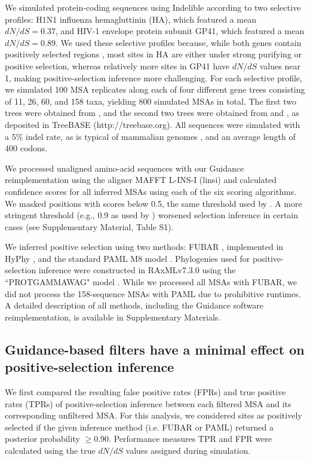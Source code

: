 \documentclass[11pt]{article}
\begin{document}
We simulated protein-coding sequences using Indelible \citep{Fletcher2009} according to two selective profiles: H1N1 influenza hemagluttinin (HA), which featured a mean $dN/dS = 0.37$, and HIV-1 envelope protein subunit GP41, which featured a mean $dN/dS = 0.89$. We used these selective profiles because, while both genes contain positively selected regions \citep{Bush1999, Frost2001, Bandawe2008, Meyer2012}, most sites in HA are either under strong purifying or positive selection, whereas relatively more sites in GP41 have $dN/dS$ values near 1, making positive-selection inference more challenging. For each selective profile, we simulated 100 MSA replicates along each of four different gene trees consisting of 11, 26, 60, and 158 taxa, yielding 800 simulated MSAs in total. The first two trees were obtained from \citet{Spielman2013}, and the second two trees were obtained from \citet{Yang2011} and \citet{Betancur2013}, as deposited in TreeBASE (http://treebase.org). All sequences were simulated with a 5\% indel rate, as is typical of mammalian genomes \citep{Cooper2004}, and an average length of 400 codons.

We processed unaligned amino-acid sequences with our Guidance reimplementation using the aligner MAFFT L-INS-I (linsi) \citep{Katoh2002,Katoh2005} and calculated confidence scores for all inferred MSAs using each of the six scoring algorithms. We masked positions with scores below 0.5, the same threshold used by \citet{Jordan2012}. A more stringent threshold (e.g., 0.9 as used by \citealt{Privman2012}) worsened selection inference in certain cases (see Supplementary Material, Table S1).

We inferred positive selection using two methods: FUBAR \citep{Murrell2013}, implemented in HyPhy \citep{Pond2005}, and the standard PAML M8 model \citep{Yang2000, Yang2007}. Phylogenies used for positive-selection inference were constructed in RAxMLv7.3.0 using the ``PROTGAMMAWAG" model \citep{Stamatakis2006}. While we processed all MSAs with FUBAR, we did not process the 158-sequence MSAs with PAML due to prohibitive runtimes. A detailed description of all methods, including the Guidance software reimplementation, is available in Supplementary Materials.


\subsection*{Guidance-based filters have a minimal effect on positive-selection inference}

We first compared the resulting false positive rates (FPRs) and true positive rates (TPRs) of positive-selection inference between each filtered MSA and its corresponding unfiltered MSA. For this analysis, we considered sites as positively selected if the given inference method (i.e. FUBAR or PAML) returned a posterior probability $\geq0.90$. Performance measures TPR and FPR were calculated using the true $dN/dS$ values assigned during simulation. 
\end{document}
